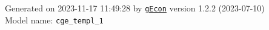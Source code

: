 \documentclass[10pt,a4paper]{article}
\numberwithin{equation}{section}
\begin{document}
\begin{landscape}
\begin{flushleft}{\large
Generated  on 2023-11-17 11:49:28 by \href{http://gecon.r-forge.r-project.org/}{\texttt{gEcon}} version 1.2.2 (2023-07-10)\\
Model name: \verb+cge_templ_1+
}\end{flushleft}


\end{landscape}

\end{document}
